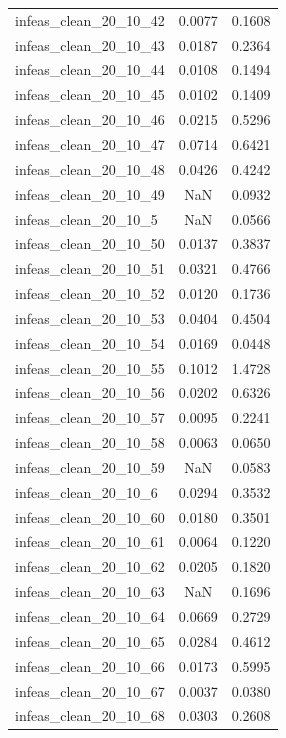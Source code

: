 \begin{longtable}{lcc}
infeas\_clean\_20\_10\_42  &   0.0077 &  0.1608 \\
infeas\_clean\_20\_10\_43  &   0.0187 &  0.2364 \\
infeas\_clean\_20\_10\_44  &   0.0108 &  0.1494 \\
infeas\_clean\_20\_10\_45  &   0.0102 &  0.1409 \\
infeas\_clean\_20\_10\_46  &   0.0215 &  0.5296 \\
infeas\_clean\_20\_10\_47  &   0.0714 &  0.6421 \\
infeas\_clean\_20\_10\_48  &   0.0426 &  0.4242 \\
infeas\_clean\_20\_10\_49  &      NaN &  0.0932 \\
infeas\_clean\_20\_10\_5   &      NaN &  0.0566 \\
infeas\_clean\_20\_10\_50  &   0.0137 &  0.3837 \\
infeas\_clean\_20\_10\_51  &   0.0321 &  0.4766 \\
infeas\_clean\_20\_10\_52  &   0.0120 &  0.1736 \\
infeas\_clean\_20\_10\_53  &   0.0404 &  0.4504 \\
infeas\_clean\_20\_10\_54  &   0.0169 &  0.0448 \\
infeas\_clean\_20\_10\_55  &   0.1012 &  1.4728 \\
infeas\_clean\_20\_10\_56  &   0.0202 &  0.6326 \\
infeas\_clean\_20\_10\_57  &   0.0095 &  0.2241 \\
infeas\_clean\_20\_10\_58  &   0.0063 &  0.0650 \\
infeas\_clean\_20\_10\_59  &      NaN &  0.0583 \\
infeas\_clean\_20\_10\_6   &   0.0294 &  0.3532 \\
infeas\_clean\_20\_10\_60  &   0.0180 &  0.3501 \\
infeas\_clean\_20\_10\_61  &   0.0064 &  0.1220 \\
infeas\_clean\_20\_10\_62  &   0.0205 &  0.1820 \\
infeas\_clean\_20\_10\_63  &      NaN &  0.1696 \\
infeas\_clean\_20\_10\_64  &   0.0669 &  0.2729 \\
infeas\_clean\_20\_10\_65  &   0.0284 &  0.4612 \\
infeas\_clean\_20\_10\_66  &   0.0173 &  0.5995 \\
infeas\_clean\_20\_10\_67  &   0.0037 &  0.0380 \\
infeas\_clean\_20\_10\_68  &   0.0303 &  0.2608 \\

\end{longtable}
